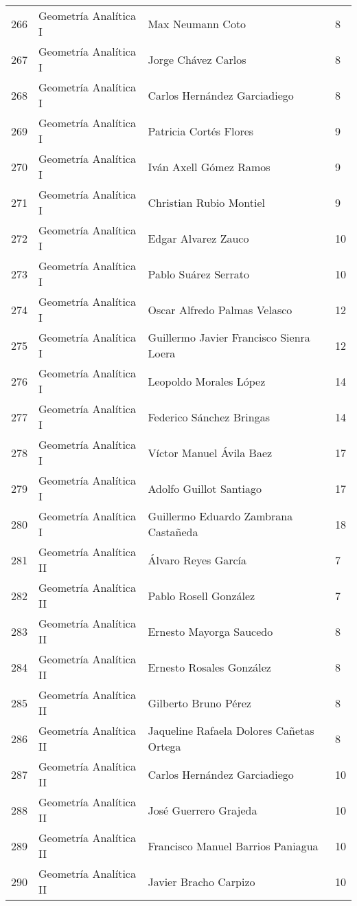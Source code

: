 \begin{table}[ht]
\begin{tabular}{rlll}
  266 & Geometría Analítica I & Max Neumann Coto & 8 \\ 
  267 & Geometría Analítica I & Jorge Chávez Carlos & 8 \\ 
  268 & Geometría Analítica I & Carlos Hernández Garciadiego & 8 \\ 
  269 & Geometría Analítica I & Patricia Cortés Flores & 9 \\ 
  270 & Geometría Analítica I & Iván Axell Gómez Ramos & 9 \\ 
  271 & Geometría Analítica I & Christian Rubio Montiel & 9 \\ 
  272 & Geometría Analítica I & Edgar Alvarez Zauco & 10 \\ 
  273 & Geometría Analítica I & Pablo Suárez Serrato & 10 \\ 
  274 & Geometría Analítica I & Oscar Alfredo Palmas Velasco & 12 \\ 
  275 & Geometría Analítica I & Guillermo Javier Francisco Sienra Loera & 12 \\ 
  276 & Geometría Analítica I & Leopoldo Morales López & 14 \\ 
  277 & Geometría Analítica I & Federico Sánchez Bringas & 14 \\ 
  278 & Geometría Analítica I & Víctor Manuel Ávila Baez & 17 \\ 
  279 & Geometría Analítica I & Adolfo Guillot Santiago & 17 \\ 
  280 & Geometría Analítica I & Guillermo Eduardo Zambrana Castañeda & 18 \\ 
  281 & Geometría Analítica II & Álvaro Reyes García & 7 \\ 
  282 & Geometría Analítica II & Pablo Rosell González & 7 \\ 
  283 & Geometría Analítica II & Ernesto Mayorga Saucedo & 8 \\ 
  284 & Geometría Analítica II & Ernesto Rosales González & 8 \\ 
  285 & Geometría Analítica II & Gilberto Bruno Pérez & 8 \\ 
  286 & Geometría Analítica II & Jaqueline Rafaela Dolores Cañetas Ortega & 8 \\ 
  287 & Geometría Analítica II & Carlos Hernández Garciadiego & 10 \\ 
  288 & Geometría Analítica II & José Guerrero Grajeda & 10 \\ 
  289 & Geometría Analítica II & Francisco Manuel Barrios Paniagua & 10 \\ 
  290 & Geometría Analítica II & Javier Bracho Carpizo & 10 \\ 

\end{tabular}
\end{table}
